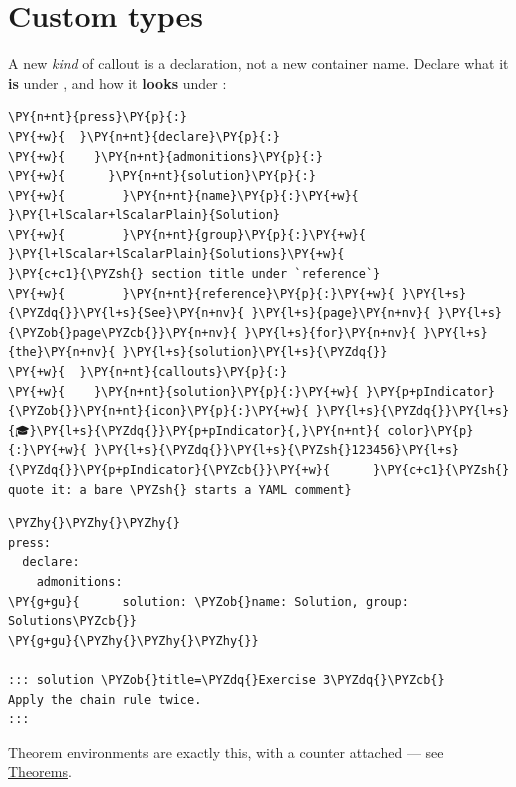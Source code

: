 \documentclass[a4paper,twoside]{article}
\begin{document}
\section{Custom types}
A new \emph{kind} of callout is a declaration, not a new container name. Declare what
it \textbf{is} under , and how it \textbf{looks} under :
\begin{tscode}[lang=yaml, engine=pygments]
\begin{Verbatim}[commandchars=\\\{\},breaklines, breakanywhere, commandchars=\\\{\}]
\PY{n+nt}{press}\PY{p}{:}
\PY{+w}{  }\PY{n+nt}{declare}\PY{p}{:}
\PY{+w}{    }\PY{n+nt}{admonitions}\PY{p}{:}
\PY{+w}{      }\PY{n+nt}{solution}\PY{p}{:}
\PY{+w}{        }\PY{n+nt}{name}\PY{p}{:}\PY{+w}{ }\PY{l+lScalar+lScalarPlain}{Solution}
\PY{+w}{        }\PY{n+nt}{group}\PY{p}{:}\PY{+w}{ }\PY{l+lScalar+lScalarPlain}{Solutions}\PY{+w}{                          }\PY{c+c1}{\PYZsh{} section title under `reference`}
\PY{+w}{        }\PY{n+nt}{reference}\PY{p}{:}\PY{+w}{ }\PY{l+s}{\PYZdq{}}\PY{l+s}{See}\PY{n+nv}{ }\PY{l+s}{page}\PY{n+nv}{ }\PY{l+s}{\PYZob{}page\PYZcb{}}\PY{n+nv}{ }\PY{l+s}{for}\PY{n+nv}{ }\PY{l+s}{the}\PY{n+nv}{ }\PY{l+s}{solution}\PY{l+s}{\PYZdq{}}
\PY{+w}{  }\PY{n+nt}{callouts}\PY{p}{:}
\PY{+w}{    }\PY{n+nt}{solution}\PY{p}{:}\PY{+w}{ }\PY{p+pIndicator}{\PYZob{}}\PY{n+nt}{icon}\PY{p}{:}\PY{+w}{ }\PY{l+s}{\PYZdq{}}\PY{l+s}{🎓}\PY{l+s}{\PYZdq{}}\PY{p+pIndicator}{,}\PY{n+nt}{ color}\PY{p}{:}\PY{+w}{ }\PY{l+s}{\PYZdq{}}\PY{l+s}{\PYZsh{}123456}\PY{l+s}{\PYZdq{}}\PY{p+pIndicator}{\PYZcb{}}\PY{+w}{      }\PY{c+c1}{\PYZsh{} quote it: a bare \PYZsh{} starts a YAML comment}
\end{Verbatim}
\end{tscode}
\begin{tscode}[lang=md, engine=pygments]
\begin{Verbatim}[commandchars=\\\{\},breaklines, breakanywhere, commandchars=\\\{\}]
\PYZhy{}\PYZhy{}\PYZhy{}
press:
  declare:
    admonitions:
\PY{g+gu}{      solution: \PYZob{}name: Solution, group: Solutions\PYZcb{}}
\PY{g+gu}{\PYZhy{}\PYZhy{}\PYZhy{}}

::: solution \PYZob{}title=\PYZdq{}Exercise 3\PYZdq{}\PYZcb{}
Apply the chain rule twice.
:::
\end{Verbatim}
\end{tscode}
Theorem environments are exactly this, with a counter attached --- see
\href{notes.md\#theorems}{Theorems}.
\end{document}
